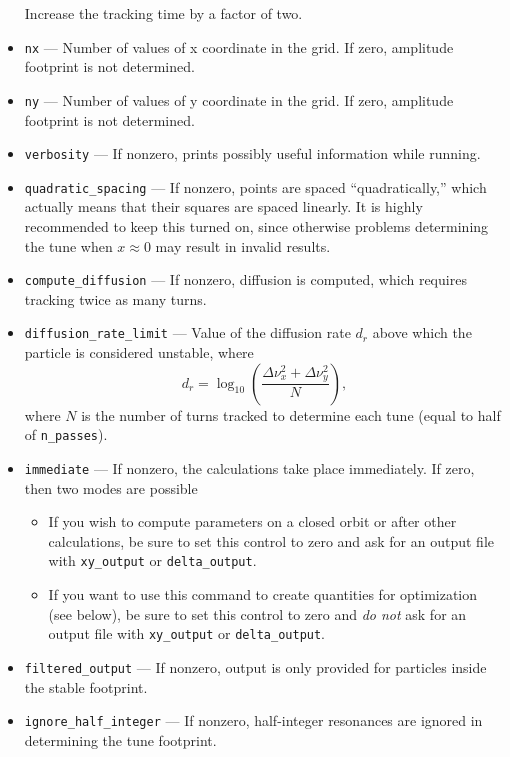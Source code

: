 \documentclass[11pt]{article}
\begin{document}
\begin{itemize}
  Increase the tracking time by a factor of two.
\item \verb|nx| --- Number of values of x coordinate in the grid. If zero, amplitude footprint is not determined.
\item \verb|ny| --- Number of values of y coordinate in the grid. If zero, amplitude footprint is not determined.
\item \verb|verbosity| --- If nonzero, prints possibly useful information while running.
\item \verb|quadratic_spacing| --- If nonzero, points are spaced ``quadratically,'' which actually means that
  their squares are spaced linearly. It is highly recommended to keep this turned on, since otherwise problems determining the
  tune when $x \approx 0$ may result in invalid results.
\item \verb|compute_diffusion| --- If nonzero, diffusion is computed, which requires tracking twice as many turns.
\item \verb|diffusion_rate_limit| --- Value of the diffusion rate $d_r$ above which the particle is considered unstable,
where
\begin{equation}
  d_r = \log_{10} \left(\frac{\Delta\nu_x^2 + \Delta\nu_y^2}{N}\right),
\end{equation}
where $N$ is the number of turns tracked to determine each tune (equal to half of \verb|n_passes|).
\item \verb|immediate| --- If nonzero, the calculations take place immediately. If zero, then two modes are possible
  \begin{itemize}
    \item If you wish to compute parameters on a closed orbit or after other calculations, be sure to set this control to zero
      and ask for an output file with \verb|xy_output| or \verb|delta_output|.
    \item If you want to use this command to create quantities for optimization (see below), be sure to set this control to zero
      and {\em do not} ask for an output file with \verb|xy_output| or \verb|delta_output|.
  \end{itemize}
\item \verb|filtered_output| --- If nonzero, output is only provided for particles inside the stable footprint.
\item \verb|ignore_half_integer| --- If nonzero, half-integer resonances are ignored in determining the tune footprint.
\end{itemize}
\end{document}
